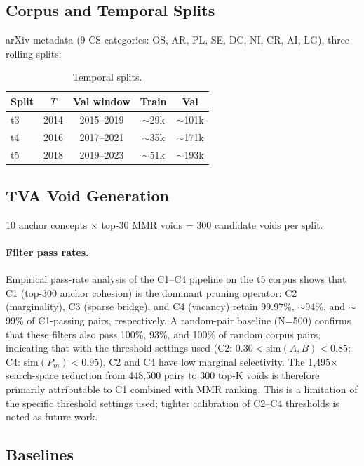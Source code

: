 \documentclass[11pt,twocolumn]{article}
\begin{document}
\subsection{Corpus and Temporal Splits}

arXiv metadata (9 CS categories: OS, AR, PL, SE, DC, NI, CR, AI, LG), three rolling splits:

\begin{table}[h!]
\centering
\caption{Temporal splits.}
\begin{tabular}{lcccc}
\toprule
Split & $T$ & Val window & Train & Val \\
\midrule
t3 & 2014 & 2015--2019 & $\sim$29k & $\sim$101k \\
t4 & 2016 & 2017--2021 & $\sim$35k & $\sim$171k \\
t5 & 2018 & 2019--2023 & $\sim$51k & $\sim$193k \\
\bottomrule
\end{tabular}
\end{table}

\subsection{TVA Void Generation}

10 anchor concepts $\times$ top-30 MMR voids = 300 candidate voids per split.

\paragraph{Filter pass rates.}
Empirical pass-rate analysis of the C1--C4 pipeline on the t5 corpus shows that C1
(top-300 anchor cohesion) is the dominant pruning operator: C2 (marginality),
C3 (sparse bridge), and C4 (vacancy) retain 99.97\%, $\sim$94\%, and $\sim$99\%
of C1-passing pairs, respectively. A random-pair baseline (N=500) confirms that these
filters also pass 100\%, 93\%, and 100\% of random corpus pairs, indicating that
with the threshold settings used (C2: $0.30 < \mathrm{sim}(A,B) < 0.85$; C4:
$\mathrm{sim}(P_m) < 0.95$), C2 and C4 have low marginal selectivity.
The 1,495$\times$ search-space reduction from 448,500 pairs to 300 top-K voids is
therefore primarily attributable to C1 combined with MMR ranking.
This is a limitation of the specific threshold settings used; tighter calibration
of C2--C4 thresholds is noted as future work.

\subsection{Baselines}
\end{document}
